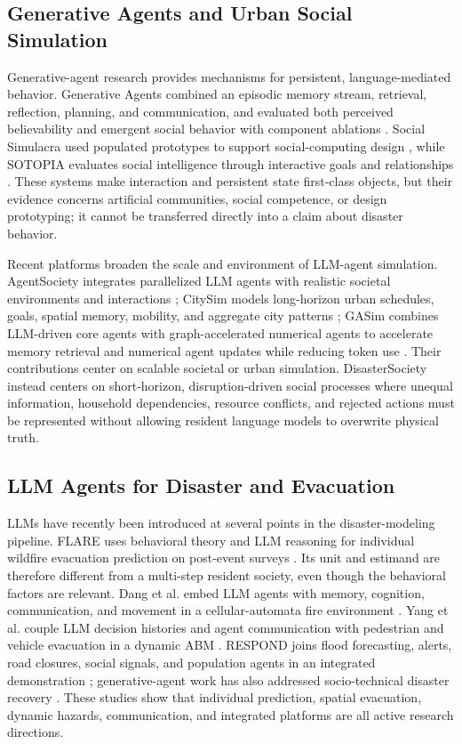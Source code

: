 \documentclass[journal]{IEEEtran}
\begin{document}
\subsection{Generative Agents and Urban Social Simulation}

Generative-agent research provides mechanisms for persistent, language-mediated
behavior. Generative Agents combined an episodic memory stream, retrieval,
reflection, planning, and communication, and evaluated both perceived
believability and emergent social behavior with component ablations
\cite{park2023generativeagents}. Social Simulacra used populated prototypes to
support social-computing design \cite{park2022socialsimulacra}, while SOTOPIA
evaluates social intelligence through interactive goals and relationships
\cite{zhou2024sotopia}. These systems make interaction and persistent state
first-class objects, but their evidence concerns artificial communities, social
competence, or design prototyping; it cannot be transferred directly into a
claim about disaster behavior.

Recent platforms broaden the scale and environment of LLM-agent simulation.
AgentSociety integrates parallelized LLM agents with realistic societal
environments and interactions \cite{zhang2025agentsociety}; CitySim models
long-horizon urban schedules, goals, spatial memory, mobility, and aggregate city
patterns \cite{bougie2025citysim}; GASim combines LLM-driven core agents with
graph-accelerated numerical agents to accelerate memory retrieval and numerical
agent updates while reducing token use
\cite{zhou2026gasim}. Their contributions center on scalable societal or urban
simulation. DisasterSociety instead centers on short-horizon, disruption-driven
social processes where unequal information, household dependencies, resource
conflicts, and rejected actions must be represented without allowing resident
language models to overwrite physical truth.

\subsection{LLM Agents for Disaster and Evacuation}

LLMs have recently been introduced at several points in the disaster-modeling
pipeline. FLARE uses behavioral theory and LLM reasoning for individual wildfire
evacuation prediction on post-event surveys \cite{chen2025flare}. Its unit and
estimand are therefore different from a multi-step resident society, even though
the behavioral factors are relevant. Dang et al. embed LLM agents with memory,
cognition, communication, and movement in a cellular-automata fire environment
\cite{dang2025fireagents}. Yang et al. couple LLM decision histories and agent
communication with pedestrian and vehicle evacuation in a dynamic ABM
\cite{yang2026whenagents}. RESPOND joins flood forecasting, alerts, road
closures, social signals, and population agents in an integrated demonstration
\cite{sultimov2026respond}; generative-agent work has also addressed
socio-technical disaster recovery \cite{blagojevic2026sociotechnical}. These
studies show that individual prediction, spatial evacuation, dynamic hazards,
communication, and integrated platforms are all active research directions.
\end{document}
